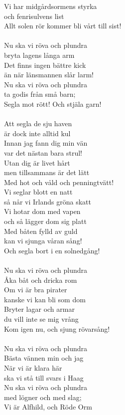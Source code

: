 \documentclass[a5paper,15pt]{article}
\begin{document}
Vi har midgårdsormens styrka\\
och fenrisulvens list\\
Allt solen rör kommer bli vårt till sist!\\
\\
Nu ska vi röva och plundra \\
bryta lagens långa arm\\
Det finns ingen bättre kick \\
än när länsmannen slår larm!\\
Nu ska vi röva och plundra \\
ta godis från små barn;\\
Segla mot rött! Och stjäla garn!\\
\\
Att segla de sju haven\\
är dock inte alltid kul\\
Innan jag fann dig min vän\\
var det nästan bara strul!\\
Utan dig är livet hårt\\
men tillsammans är det lätt\\
Med hot och våld och penningtvätt!\\
Vi seglar blott en natt \\
så når vi Irlands gröna skatt\\
Vi hotar dom med vapen \\
och så lägger dom sig platt\\
Med båten fylld av guld \\
kan vi sjunga våran sång!\\
Och segla bort i en solnedgång!\\
\\
Nu ska vi röva och plundra\\
Åka båt och dricka rom\\
Om vi är bra pirater \\
kanske vi kan bli som dom\\
Bryter lagar och armar\\
du vill inte se mig vrång\\
Kom igen nu, och sjung rövarsång!\\
\\
Nu ska vi röva och plundra\\
Bästa vännen min och jag\\
När vi är klara här \\
ska vi stå till svars i Haag\\
Nu ska vi röva och plundra \\
med lögner och med slag;\\
Vi är Alfhild, och Röde Orm\\
\\
\end{document}
